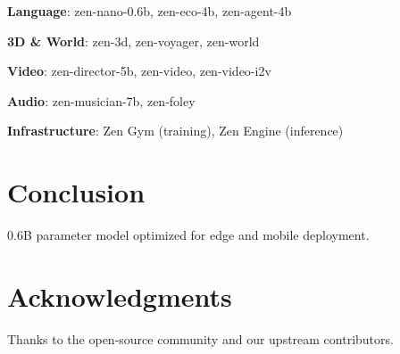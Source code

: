 \documentclass[11pt,a4paper]{article}
\begin{document}
\textbf{Language}: zen-nano-0.6b, zen-eco-4b, zen-agent-4b

\textbf{3D \& World}: zen-3d, zen-voyager, zen-world

\textbf{Video}: zen-director-5b, zen-video, zen-video-i2v

\textbf{Audio}: zen-musician-7b, zen-foley

\textbf{Infrastructure}: Zen Gym (training), Zen Engine (inference)

\section{Conclusion}
0.6B parameter model optimized for edge and mobile deployment.

\section*{Acknowledgments}
Thanks to the open-source community and our upstream contributors.



\end{document}
